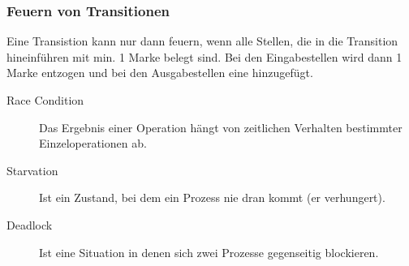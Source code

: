\subsubsection{Feuern von Transitionen }
  Eine Transistion kann nur dann feuern, wenn alle Stellen, die in die Transition hineinführen mit min.
  1 Marke belegt sind. Bei den Eingabestellen wird dann 1 Marke entzogen und bei den Ausgabestellen eine hinzugefügt.

\begin{description}
  \item[Race Condition]  Das Ergebnis einer Operation hängt von zeitlichen Verhalten bestimmter Einzeloperationen ab.
  \item[Starvation]      Ist ein Zustand, bei dem ein Prozess nie dran kommt (er verhungert). 
  \item[Deadlock]        Ist eine Situation in denen sich zwei Prozesse gegenseitig blockieren.
\end{description}


